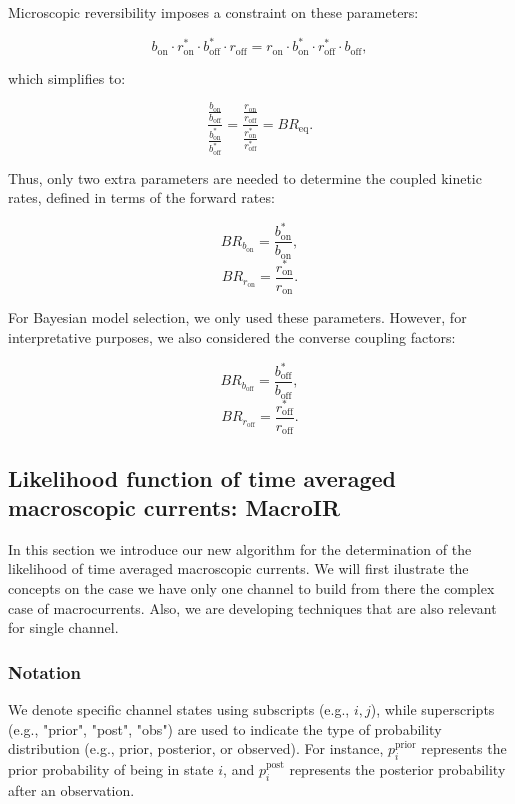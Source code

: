 \documentclass[pdflatex,sn-mathphys-num]{sn-jnl}%
\theoremstyle{thmstyleone}%
\theoremstyle{thmstyletwo}%
\theoremstyle{thmstylethree}%
\begin{document}
Microscopic reversibility imposes a constraint on these parameters:

\[
b_{\text{on}} \cdot r^*_{\text{on}} \cdot b^*_{\text{off}} \cdot r_{\text{off}} = r_{\text{on}} \cdot b^*_{\text{on}} \cdot r^*_{\text{off}} \cdot b_{\text{off}},
\]

which simplifies to:

\[
\frac {\frac {b_{\text{on}}}{b_{\text{off}}}}{\frac {b^*_{\text{on}}} {b^*_{\text{off}}}} = \frac {\frac {r_{\text{on}}}{r_{\text{off}}}}{\frac {r^*_{\text{on}}} {r^*_{\text{off}}}} = BR_{\text{eq}}.
\]

Thus, only two extra parameters are needed to determine the coupled kinetic rates, defined in terms of the forward rates:

\[
BR_{b_{\text{on}}} = \frac{b^*_{\text{on}}}{b_{\text{on}}},
\]
\[
BR_{r_{\text{on}}} = \frac{r^*_{\text{on}}}{r_{\text{on}}}.
\]

For Bayesian model selection, we only used these parameters. However, for interpretative purposes, we also considered the converse coupling factors:

\[
BR_{b_{\text{off}}} = \frac{b^*_{\text{off}}}{b_{\text{off}}},
\]
\[
BR_{r_{\text{off}}} = \frac{r^*_{\text{off}}}{r_{\text{off}}}.
\]

\subsection{Likelihood function of time averaged macroscopic currents: MacroIR}
In this section we introduce our new algorithm for the determination of the likelihood of time averaged macroscopic currents. We will first ilustrate the concepts on the case we have only one channel to build from there the complex case of macrocurrents. Also, we are developing techniques that are also relevant for single channel.   

\subsubsection{Notation}
We denote specific channel states using subscripts (e.g., \( i, j \)), while superscripts (e.g., "prior", "post", "obs") are used to indicate the type of probability distribution (e.g., prior, posterior, or observed). For instance, \( p_i^{\text{prior}} \) represents the prior probability of being in state \( i \), and \( p_i^{\text{post}} \) represents the posterior probability after an observation.

\end{document}
